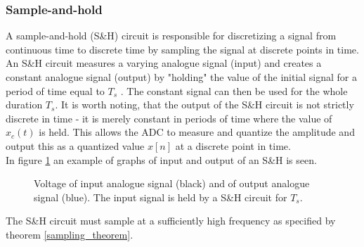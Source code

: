 \subsubsection{Sample-and-hold}
 A sample-and-hold (S\&H) circuit is responsible for discretizing a signal from continuous time to discrete time by sampling the signal at discrete points in time. An S\&H circuit measures a varying analogue signal (input) and creates a constant analogue signal (output) by "holding" the value of the initial signal for a period of time equal to $T_s$ \cite{pelgrom}. The constant signal can then be used for the whole duration $T_s$. It is worth noting, that the output of the S\&H circuit is not strictly discrete in time - it is merely constant in periods of time where the value of $x_c(t)$ is held. This allows the ADC to measure and quantize the amplitude and output this as a quantized value $x[n]$ at a discrete point in time.\\
In figure \ref{fig:S/H} an example of graphs of input and output of an S\&H is seen.
\begin{figure}[H]
\centering
{}
\caption{Voltage of input analogue signal (black) and of output analogue signal (blue). The input signal is held by a S\&H circuit for $T_s$.}
\label{fig:S/H}
\end{figure}
\noindent The S\&H circuit must sample at a sufficiently high frequency as specified by theorem \ref{sampling_theorem}.
